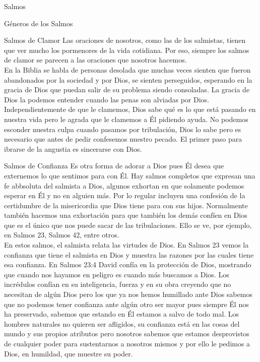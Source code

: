 \begin{section}{Salmos}
\begin{subsection}{Géneros de los Salmos}
\begin{subsubsection}{Salmos de Clamor}
			Las oraciones de nosotros, como las de los salmistas, tienen que ver mucho los pormenores de la vida cotidiana. Por eso, siempre los salmos de clamor se parecen a las oraciones que nosotros hacemos.\\
			En la Biblia se habla de personas desolada que muchas veces sienten que fueron abandonados por la sociedad y por Dios, se sienten perseguidos, esperando en la gracia de Dios que puedan salir de su problema siendo consoladas. La gracia de Dios la podemos entender cuando las penas son alviadas por Dios.\\
			Independientemente de que le clamemos, Dios sabe qué es lo que está pasando en nuestra vida pero le agrada que le clamemos a Él pidiendo ayuda. No podemos esconder nuestra culpa cuando pasamos por tribulación, Dios lo sabe pero es necesario que antes de pedir confesemos nuestro pecado. El primer paso para ibrarse de la angustia es sincerarse con Dios.
		\end{subsubsection}
		\begin{subsubsection}{Salmos de Confianza}
			Es otra forma de adorar a Dios pues Él desea que externemos lo que sentimos para con Él. Hay salmos completos que expresan una fe abbsoluta del salmista a Dios, algunos exhortan en que solamente podemos esperar en Él y no en alguien más. Por lo regular incluyen una confesión de la certidumbre de la misericordia que Dios tiene para con sus hijos. Normalmente también hacemos una exhortación para que también los demás confíen en Dios que es el único que nos puede sacar de las tribulaciones. Ello se ve, por ejemplo, en Salmos 23, Salmos 42, entre otros.\\
			En estos salmos, el salmista relata las virtudes de Dios. En Salmos 23 vemos la confianza que tiene el salmista en Dios y muestra las razones por las cuales tiene esa confianza. En Salmos 23:4 David confía en la protección de Dios, mostrando que cuando nos hayamos en peligro es cuando más buscamos a Dios. Los incrédulos confían en su inteligencia, fuerza y en su obra creyendo que no necesitan de algún Dios pero los que ya nos hemos humillado ante Dios sabemos que no podemos tener confianza ante algún otro ser mayor pues siempre Él nos ha preservado, sabemos que estando en Él estamos a salvo de todo mal. Los hombres naturales no quieren ser afligidos, su confianza está en las cosas del mundo y sus propios atributos pero nosotros sabemos que estamos desprovistos de cualquier poder para sustentarnos a nosotros mismos y por ello le pedimos a Dios, en humildad, que muestre su poder.\\

\end{subsubsection}
\end{subsection}
\end{section}
